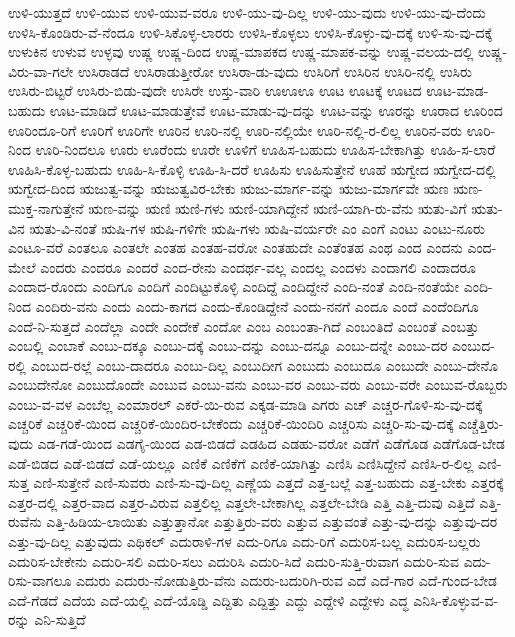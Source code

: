 {ಉಳಿ-ಯುತ್ತದೆ
ಉಳಿ-ಯುವ
ಉಳಿ-ಯುವ-ವರೂ
ಉಳಿ-ಯು-ವು-ದಿಲ್ಲ
ಉಳಿ-ಯು-ವುದು
ಉಳಿ-ಯು-ವು-ದೆಂದು
ಉಳಿಸಿ-ಕೊಂಡಿರು-ವೆ-ನೆಂದೂ
ಉಳಿ-ಸಿಕೊಳ್ಳ-ಲಾರರು
ಉಳಿಸಿ-ಕೊಳ್ಳಲು
ಉಳಿಸಿ-ಕೊಳ್ಳು-ವು-ದಕ್ಕೆ
ಉಳಿ-ಸು-ವು-ದಕ್ಕೆ
ಉಳುಕಿನ
ಉಳುವ
ಉಳ್ಳವು
ಉಷ್ಣ
ಉಷ್ಣ-ದಿಂದ
ಉಷ್ಣ-ಮಾಪಕದ
ಉಷ್ಣ-ಮಾಪಕ-ವನ್ನು
ಉಷ್ಣ-ವಲಯ-ದಲ್ಲಿ
ಉಷ್ಣ-ವಿರು-ವಾ-ಗಲೇ
ಉಸಿರಾಡದೆ
ಉಸಿರಾಡುತ್ತೀರೋ
ಉಸಿರಾ-ಡು-ವುದು
ಉಸಿರಿಗೆ
ಉಸಿರಿನ
ಉಸಿರಿ-ನಲ್ಲಿ
ಉಸಿರು
ಉಸಿರು-ಬಿಟ್ಟರೆ
ಉಸಿರು-ಬಿಡು-ವುದೇ
ಉಸಿರೇ
ಉಸ್ತು-ವಾರಿ
ಊಊಊ
ಊಟ
ಊಟಕ್ಕೆ
ಊಟದ
ಊಟ-ಮಾಡ-ಬಹುದು
ಊಟ-ಮಾಡಿದೆ
ಊಟ-ಮಾಡುತ್ತೇವೆ
ಊಟ-ಮಾಡು-ವು-ದನ್ನು
ಊಟ-ವನ್ನು
ಊರನ್ನು
ಊರಾದ
ಊರಿಂದ
ಊರಿಂದೂ-ರಿಗೆ
ಊರಿಗೆ
ಊರಿಗೇ
ಊರಿನ
ಊರಿ-ನಲ್ಲಿ
ಊರಿ-ನಲ್ಲಿಯೇ
ಊರಿ-ನಲ್ಲಿ-ರ-ಲಿಲ್ಲ
ಊರಿನ-ವರು
ಊರಿ-ನಿಂದ
ಊರಿ-ನಿಂದಲೂ
ಊರು
ಊರೆಂದು
ಊರೇ
ಊಳಿಗೆ
ಊಹಿಸ-ಬಹುದು
ಊಹಿಸ-ಬೇಕಾಗಿತ್ತು
ಊಹಿ-ಸ-ಲಾರೆ
ಊಹಿಸಿ-ಕೊಳ್ಳ-ಬಹುದು
ಊಹಿ-ಸಿ-ಕೊಳ್ಳಿ
ಊಹಿ-ಸಿ-ದರೆ
ಊಹಿಸು
ಊಹಿಸುತ್ತೇನೆ
ಊಹೆ
ಋಗ್ವೇದ
ಋಗ್ವೇದ-ದಲ್ಲಿ
ಋಗ್ವೇದ-ದಿಂದ
ಋಜುತ್ವ-ವನ್ನು
ಋಜುತ್ವವಿರ-ಬೇಕು
ಋಜು-ಮಾರ್ಗ-ವನ್ನು
ಋಜು-ಮಾರ್ಗವೇ
ಋಣ
ಋಣ-ಮುಕ್ತ-ನಾಗುತ್ತೇನೆ
ಋಣ-ವನ್ನು
ಋಣಿ
ಋಣಿ-ಗಳು
ಋಣಿ-ಯಾಗಿದ್ದೇನೆ
ಋಣಿ-ಯಾಗಿ-ರು-ವೆನು
ಋತು-ವಿಗೆ
ಋತು-ವಿನ
ಋತು-ವಿ-ನಂತೆ
ಋಷಿ-ಗಳ
ಋಷಿ-ಗಳಿಗೇ
ಋಷಿ-ಗಳು
ಋಷಿ-ವರ್ಯರೇ
ಎಂ
ಎಂಗೆ
ಎಂಟು
ಎಂಟು-ನೂರು
ಎಂಟೂ-ವರೆ
ಎಂತಲೂ
ಎಂತಲೇ
ಎಂತಹ
ಎಂತಹ-ವರೋ
ಎಂತಹುದೇ
ಎಂತೆಂತಹ
ಎಂಥ
ಎಂದ
ಎಂದನು
ಎಂದ-ಮೇಲೆ
ಎಂದರು
ಎಂದರೂ
ಎಂದರೆ
ಎಂದ-ರೇನು
ಎಂದರ್ಥ-ವಲ್ಲ
ಎಂದಲ್ಲ
ಎಂದಳು
ಎಂದಾಗಲಿ
ಎಂದಾದರೂ
ಎಂದಾದ-ರೊಂದು
ಎಂದಿಗೂ
ಎಂದಿಗೆ
ಎಂದಿಟ್ಟುಕೊಳ್ಳಿ
ಎಂದಿದ್ದೆ
ಎಂದಿದ್ದೇನೆ
ಎಂದಿ-ನಂತೆ
ಎಂದಿ-ನಂತೆಯೇ
ಎಂದಿ-ನಿಂದ
ಎಂದಿರು-ವನು
ಎಂದು
ಎಂದು-ಕಾಗದ
ಎಂದು-ಕೊಂಡಿದ್ದೇನೆ
ಎಂದು-ನನಗೆ
ಎಂದೂ
ಎಂದೆ
ಎಂದೆಂದಿಗೂ
ಎಂದೆ-ನಿ-ಸುತ್ತದೆ
ಎಂದೆಲ್ಲಾ
ಎಂದೇ
ಎಂದೇಕೆ
ಎಂದೋ
ಎಂಬ
ಎಂಬಂತಾ-ಗಿದೆ
ಎಂಬಂತಿದೆ
ಎಂಬಂತೆ
ಎಂಬತ್ತು
ಎಂಬಲ್ಲಿ
ಎಂಬಾಕೆ
ಎಂಬು-ದಕ್ಕೂ
ಎಂಬು-ದಕ್ಕೆ
ಎಂಬು-ದನ್ನು
ಎಂಬು-ದನ್ನೂ
ಎಂಬು-ದನ್ನೇ
ಎಂಬು-ದರ
ಎಂಬುದ-ರಲ್ಲಿ
ಎಂಬುದ-ರಲ್ಲೆ
ಎಂಬು-ದಾದರೂ
ಎಂಬು-ದಿಲ್ಲ
ಎಂಬುದೀಗ
ಎಂಬುದು
ಎಂಬುದೂ
ಎಂಬುದೇ
ಎಂಬು-ದೇನೊ
ಎಂಬುದೇನೋ
ಎಂಬುದೊಂದೇ
ಎಂಬುವ
ಎಂಬು-ವನು
ಎಂಬು-ವರ
ಎಂಬು-ವರು
ಎಂಬು-ವರೇ
ಎಂಬುವ-ರೊಬ್ಬರು
ಎಂಬು-ವ-ವಳ
ಎಂಬೆಲ್ಲ
ಎಂಮಾರಲ್
ಎಕರೆ-ಯಿ-ರುವ
ಎಕ್ಕಡ-ಮಾಡಿ
ಎಗರು
ಎಚ್
ಎಚ್ಚರ-ಗೊಳಿ-ಸು-ವು-ದಕ್ಕೆ
ಎಚ್ಚರಿಕೆ
ಎಚ್ಚರಿಕೆ-ಯಿಂದ
ಎಚ್ಚರಿಕೆ-ಯಿಂದಿರ-ಬೇಕೆಂದು
ಎಚ್ಚರಿಕೆ-ಯಿಂದಿರಿ
ಎಚ್ಚರಿಸು
ಎಚ್ಚರಿ-ಸು-ವು-ದಕ್ಕೆ
ಎಚ್ಚೆತ್ತಿರು-ವುದು
ಎಡ-ಗಡೆ-ಯಿಂದ
ಎಡಗೈ-ಯಿಂದ
ಎಡ-ಬಿಡದೆ
ಎಡಹಿದ
ಎಡಹು-ವರೋ
ಎಡೆಗೆ
ಎಡೆಗೊಡ
ಎಡೆಗೊಡ-ಬೇಡ
ಎಡೆ-ಬಿಡದ
ಎಡೆ-ಬಿಡದೆ
ಎಡೆ-ಯಲ್ಲೂ
ಎಣಿಕೆ
ಎಣಿಕೆಗೆ
ಎಣಿಕೆ-ಯಾಗಿತ್ತು
ಎಣಿಸಿ
ಎಣಿಸಿದ್ದೇನೆ
ಎಣಿಸಿ-ರ-ಲಿಲ್ಲ
ಎಣಿ-ಸುತ್ತ
ಎಣಿ-ಸುತ್ತೇನೆ
ಎಣಿ-ಸುವರು
ಎಣಿ-ಸು-ವು-ದಿಲ್ಲ
ಎಣ್ಣೆಯ
ಎತ್ತದೆ
ಎತ್ತ-ಬಲ್ಲೆ
ಎತ್ತ-ಬಹುದು
ಎತ್ತ-ಬೇಕು
ಎತ್ತರಕ್ಕೆ
ಎತ್ತರ-ದಲ್ಲಿ
ಎತ್ತರ-ವಾದ
ಎತ್ತರ-ವಿರುವ
ಎತ್ತಲಿಲ್ಲ
ಎತ್ತಲೇ-ಬೇಕಾಗಿಲ್ಲ
ಎತ್ತಲೇ-ಬೇಡಿ
ಎತ್ತಿ
ಎತ್ತಿ-ದುವು
ಎತ್ತಿದೆ
ಎತ್ತಿ-ರುವೆನು
ಎತ್ತಿ-ಹಿಡಿಯ-ಲಾಯಿತು
ಎತ್ತುತ್ತಾನೋ
ಎತ್ತುತ್ತಿರು-ವರು
ಎತ್ತುವ
ಎತ್ತುವಂತೆ
ಎತ್ತು-ವು-ದನ್ನು
ಎತ್ತುವು-ದರ
ಎತ್ತು-ವು-ದಿಲ್ಲ
ಎತ್ತುವುದು
ಎಥಿಕಲ್
ಎದುರಾಳಿ-ಗಳ
ಎದು-ರಿಗೂ
ಎದು-ರಿಗೆ
ಎದುರಿಸ-ಬಲ್ಲ
ಎದುರಿಸ-ಬಲ್ಲರು
ಎದುರಿಸ-ಬೇಕೇನು
ಎದುರಿ-ಸಲಿ
ಎದುರಿ-ಸಲು
ಎದುರಿಸಿ
ಎದುರಿ-ಸಿದೆ
ಎದುರಿ-ಸುತ್ತಿ-ರುವಾಗ
ಎದುರಿ-ಸುವ
ಎದು-ರಿಸು-ವಾಗಲೂ
ಎದುರು
ಎದುರು-ನೋಡುತ್ತಿರು-ವೆನು
ಎದುರು-ಬದುರಿಗಿ-ರುವ
ಎದೆ
ಎದೆ-ಗಾರ
ಎದೆ-ಗುಂದ-ಬೇಡ
ಎದೆ-ಗೆಡದೆ
ಎದೆಯ
ಎದೆ-ಯಲ್ಲಿ
ಎದೆ-ಯೊಡ್ಡಿ
ಎದ್ದಿತು
ಎದ್ದಿತ್ತು
ಎದ್ದು
ಎದ್ದೇಳಿ
ಎದ್ದೇಳು
ಎದ್ಧ
ಎನಿಸಿ-ಕೊಳ್ಳುವ-ವ-ರನ್ನು
ಎನಿ-ಸುತ್ತಿದೆ
}
